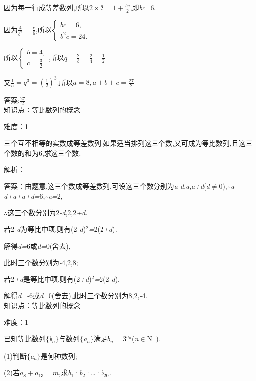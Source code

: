 \documentclass{article} %
\begin{document}
因为每一行成等差数列,所以$2\times 2=1+\frac{bc}{2}$,即\textit{bc=}6\textit{.}

因为$\frac{4}{b^2}=\frac{c}{6}$,所以$\left\{
\begin{array}{l}
bc=6, \\
b^2 c=24.
\end{array}
\right.$

所以$\left\{
\begin{array}{l}
b=4, \\
c=\frac{3}{2}
\end{array}
\right.$,所以$q=\frac{2}{b}=\frac{2}{4}=\frac{1}{2}$

又$\frac{1}{a}=q^3=(\frac{1}{2})^3$,所以$a=8,a+b+c=\frac{27}{2}$

 答案:$\frac{27}{2}$ \\

知识点：等比数列的概念

难度：1

 三个互不相等的实数成等差数列,如果适当排列这三个数,又可成为等比数列,且这三个数的和为6,求这三个数\textit{.}

解析：

 答案：由题意,这三个数成等差数列,可设这三个数分别为\textit{a-d},\textit{a},\textit{a+d}(\textit{d}$\mathrm{\neq}$0),\textit{$\therefore$a-d+a+a+d=}6,\textit{$\therefore$a=}2,

\textit{$\therefore$}这三个数分别为2\textit{-d},2,2\textit{+d.}

若2\textit{-d}为等比中项,则有(2\textit{-d})${}^{2}$\textit{=}2(2\textit{+d})\textit{.}

解得\textit{d=}6或\textit{d=}0(舍去),

此时三个数分别为\textit{-}4,2,8;

若2\textit{+d}是等比中项,则有(2\textit{+d})${}^{2}$\textit{=}2(2\textit{-d}),

解得\textit{d=-}6或\textit{d=}0(舍去),此时三个数分别为8,2,\textit{-}4\textit{.} \\

知识点：等比数列的概念

难度：1

 已知等比数列$\mathrm{\{}$\textit{b${}_{n}$}$\mathrm{\}}$与数列$\mathrm{\{}$\textit{a${}_{n}$}$\mathrm{\}}$满足$b_n=3^{a_n}$(\textit{n}$\mathrm{\in}$N${}_{+}$)\textit{.}

 (1)判断$\mathrm{\{}$\textit{a${}_{n}$}$\mathrm{\}}$是何种数列;

 (2)若$a_8+a_{13}=m$,求\textit{b}${}_{1}$·\textit{b}${}_{2}$·{\dots}·\textit{b}${}_{20}$\textit{.}
\end{document}
